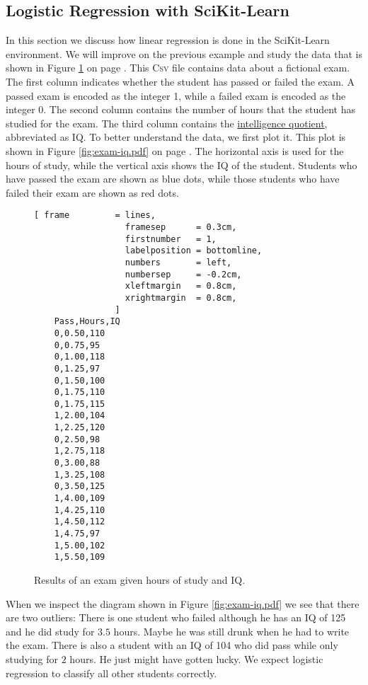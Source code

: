 \subsection{Logistic Regression with SciKit-Learn}
In this section we discuss how linear regression is done in the SciKit-Learn environment.
We will improve on the previous example and study the data that is shown in Figure \ref{fig:exam-iq.csv} on
page \pageref{fig:exam-iq.csv}.
This \textsc{Csv} file contains data about a fictional exam.  The first column indicates whether the student
has passed or failed the exam.  A passed exam is encoded as the integer 1, while a failed exam is encoded as the integer 0.
The second column contains the number of hours that the student has studied for the exam.  The third column
contains the \href{https://en.wikipedia.org/wiki/Intelligence_quotient}{intelligence quotient}, abbreviated as
IQ.  To better understand the data, we first plot it.  This plot is shown in Figure \ref{fig:exam-iq.pdf} on
page \pageref{fig:exam-iq.pdf}.  The horizontal axis is used for the hours of study, while the vertical axis
shows the IQ of the student.  Students who have passed the exam are shown as blue dots, while those students
who have failed their exam are shown as red dots.

\begin{figure}[!ht]
\centering
\begin{Verbatim}[ frame         = lines, 
                  framesep      = 0.3cm, 
                  firstnumber   = 1,
                  labelposition = bottomline,
                  numbers       = left,
                  numbersep     = -0.2cm,
                  xleftmargin   = 0.8cm,
                  xrightmargin  = 0.8cm,
                ]
    Pass,Hours,IQ
    0,0.50,110
    0,0.75,95
    0,1.00,118
    0,1.25,97
    0,1.50,100
    0,1.75,110
    0,1.75,115
    1,2.00,104
    1,2.25,120
    0,2.50,98
    1,2.75,118
    0,3.00,88
    1,3.25,108
    0,3.50,125
    1,4.00,109
    1,4.25,110
    1,4.50,112
    1,4.75,97
    1,5.00,102
    1,5.50,109
\end{Verbatim}
\vspace*{-0.3cm}
\caption{Results of an exam given hours of study and IQ.}
\label{fig:exam-iq.csv}
\end{figure}

When we inspect the diagram shown in Figure \ref{fig:exam-iq.pdf} we see that there are two outliers: There is
one student who failed although he has an IQ of 125 and he did study for $3.5$ hours.  Maybe he was still drunk
when he had to write the exam.  There is also a student with an IQ of 104 who did pass while only studying for
$2$ hours.  He just might have gotten lucky. We expect logistic regression to classify all other students
correctly.

